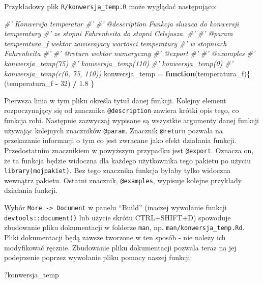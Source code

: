 \documentclass[paper=6in:9in,pagesize=pdftex,headinclude=on,footinclude=on,10pt]{scrbook}
\newenvironment{Shaded}{\begin{snugshade}}{\end{snugshade}}
\newcommand{\CommentTok}[1]{\textcolor[rgb]{0.56,0.35,0.01}{\textit{#1}}}
\newcommand{\ControlFlowTok}[1]{\textcolor[rgb]{0.13,0.29,0.53}{\textbf{#1}}}
\newcommand{\DecValTok}[1]{\textcolor[rgb]{0.00,0.00,0.81}{#1}}
\newcommand{\FloatTok}[1]{\textcolor[rgb]{0.00,0.00,0.81}{#1}}
\newcommand{\NormalTok}[1]{#1}
\newcommand{\OperatorTok}[1]{\textcolor[rgb]{0.81,0.36,0.00}{\textbf{#1}}}
\newcommand{\StringTok}[1]{\textcolor[rgb]{0.31,0.60,0.02}{#1}}
\begin{document}
Przykładowy plik \texttt{R/konwersja\_temp.R} może wyglądać następująco:

\begin{Shaded}
\begin{Highlighting}[]
\CommentTok{#' Konwersja temperatur}
\CommentTok{#'}
\CommentTok{#' @description Funkcja sluzaca do konwersji temperatury }
\CommentTok{#'   ze stopni Fahrenheita do stopni Celsjusza.}
\CommentTok{#'}
\CommentTok{#' @param temperatura_f wektor zawierajacy wartosci temperatury }
\CommentTok{#'   w stopniach Fahrenheita}
\CommentTok{#'}
\CommentTok{#' @return wektor numeryczny}
\CommentTok{#' @export}
\CommentTok{#'}
\CommentTok{#' @examples}
\CommentTok{#' konwersja_temp(75)}
\CommentTok{#' konwersja_temp(110)}
\CommentTok{#' konwersja_temp(0)}
\CommentTok{#' konwersja_temp(c(0, 75, 110))}
\NormalTok{konwersja_temp =}\StringTok{ }\ControlFlowTok{function}\NormalTok{(temperatura_f)\{}
\NormalTok{  (temperatura_f }\OperatorTok{-}\StringTok{ }\DecValTok{32}\NormalTok{) }\OperatorTok{/}\StringTok{ }\FloatTok{1.8}
\NormalTok{\}}
\end{Highlighting}
\end{Shaded}

Pierwsza linia w tym pliku określa tytuł danej funkcji.
Kolejny element rozpoczynający się od znacznika \texttt{@description} zawiera krótki opis tego, co funkcja robi.
Następnie zazwyczaj wypisane są wszystkie argumenty danej funkcji używając kolejnych znaczników \texttt{@param}.
Znacznik \texttt{@return} pozwala na przekazanie informacji o tym co jest zwracane jako efekt działania funkcji.
Przedostatnim znacznikiem w powyższym przypadku jest \texttt{@export}.
Oznacza on, że ta funkcja będzie widoczna dla każdego użytkownika tego pakietu po użyciu \texttt{library(mojpakiet)}.
Bez tego znacznika funkcja byłaby tylko widoczna wewnątrz pakietu.
Ostatni znacznik, \texttt{@examples}, wypisuje kolejne przykłady działania funkcji.

Wybór \texttt{More\ -\textgreater{}\ Document} w panelu ``Build'' (inaczej wywołanie funkcji \texttt{devtools::document()} lub użycie skrótu CTRL+SHIFT+D) spowoduje zbudowanie pliku dokumentacji w folderze \texttt{man}, np. \texttt{man/konwersja\_temp.Rd}.
Pliki dokumentacji będą zawsze tworzone w ten sposób - nie należy ich modyfikować ręcznie.
Zbudowanie pliku dokumentacji pozwala teraz na jej podejrzenie poprzez wywołanie pliku pomocy naszej funkcji:

\begin{Shaded}
\begin{Highlighting}[]
\NormalTok{?konwersja_temp}
\end{Highlighting}
\end{Shaded}
\end{document}
